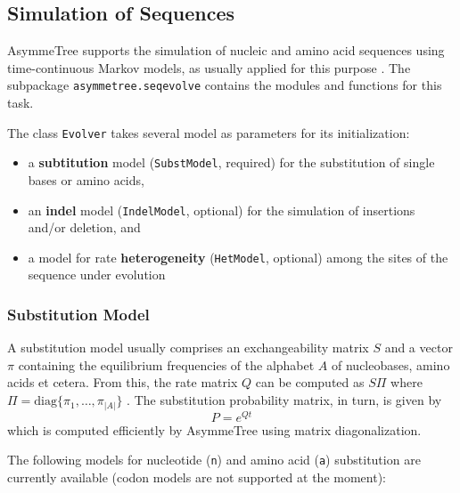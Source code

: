 \documentclass[hidelinks,11pt]{article}
\begin{document}
\subsection{Simulation of Sequences}

AsymmeTree supports the simulation of nucleic and amino acid sequences using time-continuous Markov models, as usually applied for this purpose \citep[for textbooks, see e.g.][]{felsenstein2004,yang2006,yang2014}.
The subpackage \texttt{asymmetree.seqevolve} contains the modules and functions for this task.

The class \texttt{Evolver} takes several model as parameters for its initialization:
\begin{itemize}
	\item a \textbf{subtitution} model (\texttt{SubstModel}, required) for the substitution of single bases or amino acids,
	\item an \textbf{indel} model (\texttt{IndelModel}, optional) for the simulation of insertions and/or deletion, and
	\item a model for rate \textbf{heterogeneity} (\texttt{HetModel}, optional) among the sites of the sequence under evolution
\end{itemize}

\subsubsection{Substitution Model}

A substitution model usually comprises an exchangeability matrix $S$ and a vector $\pi$ containing the equilibrium frequencies of the alphabet $A$ of nucleobases, amino acids et cetera.
From this, the rate matrix $Q$ can be computed as $S\Pi$ where $\Pi=\textrm{diag}\{\pi_1,\dots,\pi_{|A|}\}$ \citep{yang2006}.
The substitution probability matrix, in turn, is given by \[P=e^{Qt}\] which is computed efficiently by AsymmeTree using matrix diagonalization.

The following models for nucleotide (\texttt{n}) and amino acid (\texttt{a}) substitution are currently available (codon models are not supported at the moment):
\end{document}
